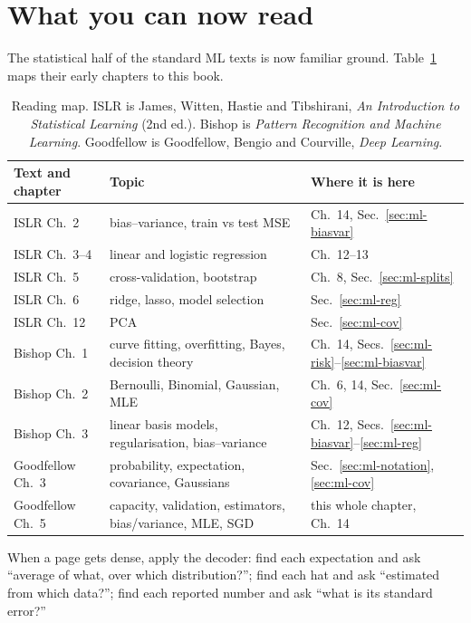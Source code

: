 \section{What you can now read}
\label{sec:ml-reading}

The statistical half of the standard ML texts is now familiar ground. Table~\ref{tab:ml-map}
maps their early chapters to this book.

\begin{table}[H]
\centering
\small
\renewcommand{\arraystretch}{1.25}
\begin{tabular}{p{4.6cm} p{4.6cm} p{3.6cm}}
\toprule
\textbf{Text and chapter} & \textbf{Topic} & \textbf{Where it is here} \\
\midrule
ISLR Ch.~2 & bias--variance, train vs test MSE & Ch.~14, Sec.~\ref{sec:ml-biasvar} \\
ISLR Ch.~3--4 & linear and logistic regression & Ch.~12--13 \\
ISLR Ch.~5 & cross-validation, bootstrap & Ch.~8, Sec.~\ref{sec:ml-splits} \\
ISLR Ch.~6 & ridge, lasso, model selection & Sec.~\ref{sec:ml-reg} \\
ISLR Ch.~12 & PCA & Sec.~\ref{sec:ml-cov} \\
Bishop Ch.~1 & curve fitting, overfitting, Bayes, decision theory & Ch.~14, Secs.~\ref{sec:ml-risk}--\ref{sec:ml-biasvar} \\
Bishop Ch.~2 & Bernoulli, Binomial, Gaussian, MLE & Ch.~6, 14, Sec.~\ref{sec:ml-cov} \\
Bishop Ch.~3 & linear basis models, regularisation, bias--variance & Ch.~12, Secs.~\ref{sec:ml-biasvar}--\ref{sec:ml-reg} \\
Goodfellow Ch.~3 & probability, expectation, covariance, Gaussians & Sec.~\ref{sec:ml-notation}, \ref{sec:ml-cov} \\
Goodfellow Ch.~5 & capacity, validation, estimators, bias/variance, MLE, SGD & this whole chapter, Ch.~14 \\
\bottomrule
\end{tabular}
\caption{Reading map. ISLR is James, Witten, Hastie and Tibshirani,
\emph{An Introduction to Statistical Learning} (2nd ed.). Bishop is \emph{Pattern Recognition
and Machine Learning}. Goodfellow is Goodfellow, Bengio and Courville, \emph{Deep Learning}.}
\label{tab:ml-map}
\end{table}

When a page gets dense, apply the decoder: find each expectation and ask ``average of what, over
which distribution?''; find each hat and ask ``estimated from which data?''; find each reported
number and ask ``what is its standard error?''


